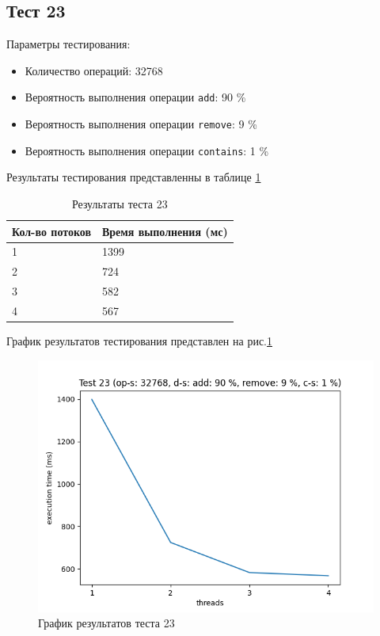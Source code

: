 \subsection*{Тест 23}

Параметры тестирования:

\begin{itemize}
    \item Количество операций: 32768
    \item Вероятность выполнения операции \verb|add|: 90 \%
    \item Вероятность выполнения операции \verb|remove|: 9 \%
    \item Вероятность выполнения операции \verb|contains|: 1 \%
\end{itemize}

Результаты тестирования представленны в таблице \ref{tab:results23}


\begin{table}[H]
    \centering
    \begin{tabular}{|l|l|}
        \hline
        Кол-во потоков & Время выполнения (мс) \\
        \hline
        1 & 1399 \\
        \hline
        2 & 724 \\
        \hline
        3 & 582 \\
        \hline
        4 & 567 \\
        \hline
    \end{tabular}
    \caption{Результаты теста 23}
    \label{tab:results23}
\end{table}
        

График результатов тестирования представлен на рис.\ref{fig:plot23}

\begin{figure}[H]
    \centering
    \includegraphics[width=0.7\linewidth]{photo/plot23}
    \caption{График результатов теста 23}
    \label{fig:plot23}
\end{figure}


